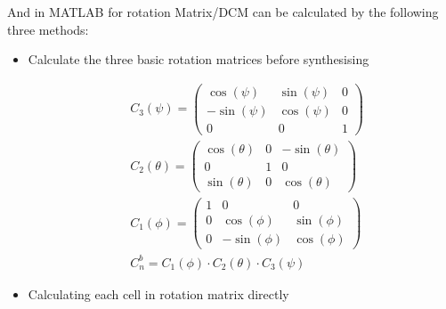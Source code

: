 \documentclass[class=article, crop=false]{standalone}
\begin{document}
And in MATLAB for rotation Matrix/DCM can be calculated by the following three methods:

\begin{itemize}
    \item Calculate the three basic rotation matrices before synthesising
    
    \begin{center}
        \begin{subequations}
        \begin{align}
            &C_3(\psi) =
            \begin{pmatrix}
            \cos{(\psi)} & \sin{(\psi)} & 0 \\
            -\sin{(\psi)} & \cos{(\psi)} & 0 \\
            0 & 0 & 1
            \end{pmatrix} \\
            &C_2(\theta) =
            \begin{pmatrix}
            \cos{(\theta)} & 0 & -\sin{(\theta)} \\
            0 & 1 & 0 \\
            \sin{(\theta)} & 0 & \cos{(\theta)}
            \end{pmatrix} \\
            &C_1(\phi) =
            \begin{pmatrix}
            1 & 0 & 0 \\
            0 & \cos{(\phi)} & \sin{(\phi)} \\
            0 & -\sin{(\phi)} & \cos{(\phi)}
            \end{pmatrix} \\
            &C_n^b = C_1(\phi) \cdot C_2(\theta) \cdot C_3(\psi)
        \end{align}
        \end{subequations}
    \end{center}

    \item Calculating each cell in rotation matrix directly
    

\end{itemize}
\end{document}

